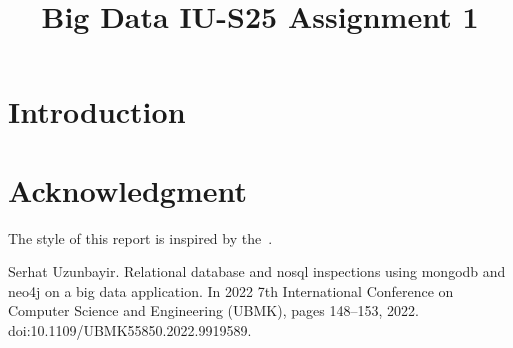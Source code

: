 \documentclass[conference]{IEEEtran}
\begin{document}
\title{Big Data IU-S25 Assignment 1}

\author{
}

\maketitle

\begin{abstract}
    \lipsum[1]
\end{abstract}


\section{Introduction}
\lipsum[2]

\section*{Acknowledgment}

The style of this report is inspired by the~\cite{uzunbayir}.



\begin{thebibliography}{00}
     Serhat Uzunbayir. Relational database and nosql inspections using mongodb and neo4j on a big data application.
    In 2022 7th International Conference on Computer Science and Engineering (UBMK), pages 148--153, 2022.
    doi:10.1109/UBMK55850.2022.9919589.
\end{thebibliography}
\end{document}
